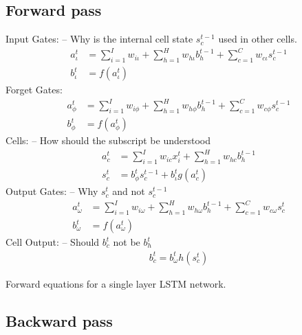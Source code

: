 \subsection{Forward pass}

\begin{equationbox}[H]
Input Gates: -- Why is the internal cell state $s_c^{t-1}$ used in other cells.
\begin{equation*}
\begin{aligned}
a_\iota^t &= \sum_{i=1}^I w_{i \iota} + \sum_{h=1}^H w_{h \iota} b_h^{t-1} + \sum_{c=1}^C w_{c \iota} s_c^{t-1} \\
b_\iota^t &= f(a_\iota^t)
\end{aligned}
\end{equation*}
Forget Gates:
\begin{equation*}
\begin{aligned}
a_\phi^t &= \sum_{i=1}^I w_{i\phi} + \sum_{h=1}^H w_{h \phi} b_h^{t-1} + \sum_{c=1}^C w_{c \phi} s_c^{t-1} \\
b_\phi^t &= f(a_\phi^t)
\end{aligned}
\end{equation*}
Cells: -- How should the subscript be understood
\begin{equation*}
\begin{aligned}
a_c^t &= \sum_{i=1}^I w_{i c} x_i^t + \sum_{h=1}^H w_{h c} b_h^{t-1} \\
s_c^t &= b_\phi^t s_c^{t-1} + b_{\iota}^t g(a_c^t)
\end{aligned}
\end{equation*}
Output Gates: -- Why $s_c^t$ and not $s_c^{t-1}$
\begin{equation*}
\begin{aligned}
a_\omega^t &= \sum_{i=1}^I w_{i\omega} + \sum_{h=1}^H w_{h \omega} b_h^{t-1} + \sum_{c=1}^C w_{c \omega} s_c^t \\
b_\omega^t &= f(a_\omega^t)
\end{aligned}
\end{equation*}
Cell Output: -- Should $b_c^t$ not be $b_h^t$
\begin{equation*}
\begin{aligned}
b_c^t = b_\omega^t h(s_c^t)
\end{aligned}
\end{equation*}
\caption{Forward equations for a single layer LSTM network.}
\end{equationbox}

\subsection{Backward pass}


